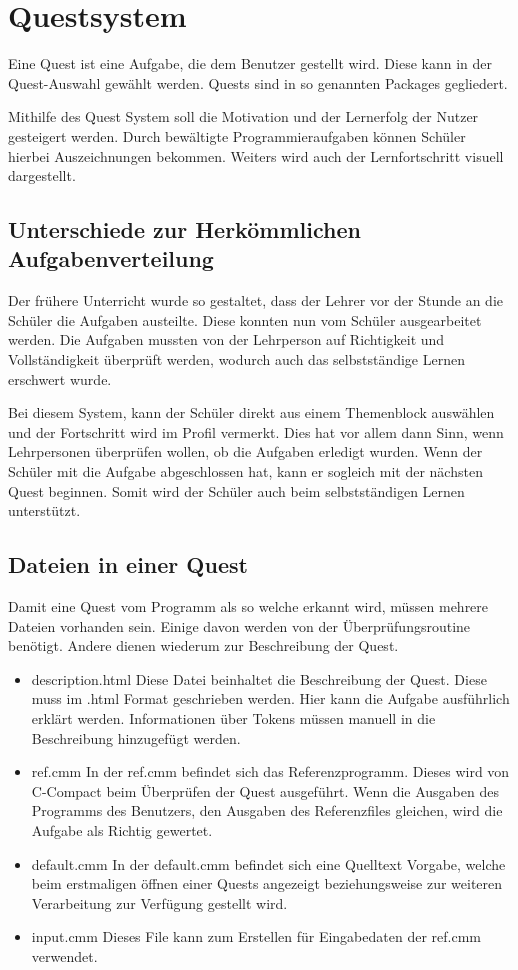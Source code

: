 \chapter{Questsystem}
Eine Quest ist eine Aufgabe, die dem Benutzer gestellt wird. Diese kann in der Quest-Auswahl gewählt werden. Quests sind in so genannten Packages gegliedert. 

Mithilfe des Quest System soll die Motivation und der Lernerfolg der Nutzer gesteigert werden. Durch bewältigte Programmieraufgaben können Schüler hierbei Auszeichnungen bekommen. Weiters wird auch der Lernfortschritt visuell dargestellt.

\section{Unterschiede zur Herkömmlichen Aufgabenverteilung}
Der frühere Unterricht wurde so gestaltet, dass der Lehrer vor der Stunde an die Schüler die Aufgaben austeilte. Diese konnten nun vom Schüler ausgearbeitet werden. Die Aufgaben mussten von der Lehrperson auf Richtigkeit und Vollständigkeit überprüft werden, wodurch auch das selbstständige Lernen erschwert wurde.

Bei diesem System, kann der Schüler direkt aus einem Themenblock auswählen und der Fortschritt wird im Profil vermerkt. Dies hat vor allem dann Sinn, wenn Lehrpersonen überprüfen wollen, ob die Aufgaben erledigt wurden. Wenn der Schüler mit die Aufgabe abgeschlossen hat, kann er sogleich mit der nächsten Quest beginnen. Somit wird der Schüler auch beim selbstständigen Lernen unterstützt.

\section{Dateien in einer Quest}
Damit eine Quest vom Programm als so welche erkannt wird, müssen mehrere Dateien vorhanden sein. Einige davon werden von der Überprüfungsroutine benötigt. Andere dienen wiederum zur Beschreibung der Quest.

\begin{itemize}
\item description.html
Diese Datei beinhaltet die Beschreibung der Quest. Diese muss im .html Format geschrieben werden. Hier kann die Aufgabe ausführlich erklärt werden. Informationen über Tokens müssen manuell in die Beschreibung hinzugefügt werden.

\item ref.cmm
In der ref.cmm befindet sich das Referenzprogramm. Dieses wird von C-Compact beim Überprüfen der Quest ausgeführt. Wenn die Ausgaben des Programms des Benutzers, den Ausgaben des Referenzfiles gleichen, wird die Aufgabe als Richtig gewertet.

\item default.cmm
In der default.cmm befindet sich eine Quelltext Vorgabe, welche beim erstmaligen öffnen einer Quests angezeigt beziehungsweise zur weiteren Verarbeitung zur Verfügung gestellt wird.

\item input.cmm
Dieses File kann zum Erstellen für Eingabedaten der ref.cmm verwendet.
\end{itemize}

